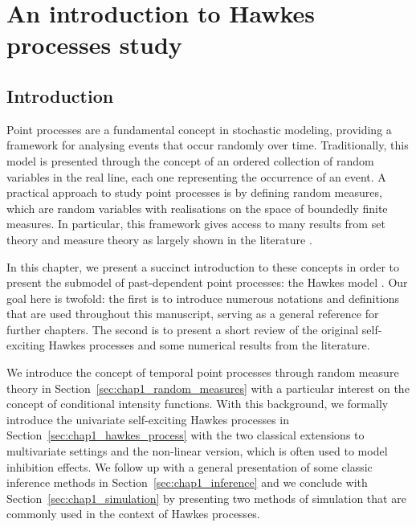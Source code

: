 \leadchapter{
  
}

\chapter[][]{An introduction to Hawkes processes study}\label{chapter:background}

\section{Introduction}

Point processes are a fundamental concept in stochastic modeling, providing a framework for analysing events that occur randomly over time. 
Traditionally, this model is presented through the concept of an ordered collection of random variables in the real line, each one representing the occurrence of an event.
A practical approach to study point processes is by defining random measures, which are random variables with realisations on the space of boundedly finite measures.
In particular, this framework gives access to many results from set theory and measure theory as largely shown in the literature \parencite{Cox1980, Baddeley2006, DaleyV2, Baccelli2020}.

In this chapter, we present a succinct introduction to these concepts in order to present the submodel of past-dependent point processes: the Hawkes model \parencite{Hawkes1971}.
Our goal here is twofold: the first is to introduce numerous notations and definitions that are used throughout this manuscript, serving as a general reference for further chapters. The second is to present a short review of the original self-exciting Hawkes processes and some numerical results from the literature.

We introduce the concept of temporal point processes through random measure theory in Section~\ref{sec:chap1_random_measures} with a particular interest on the concept of conditional intensity functions. 
With this background, we formally introduce the univariate self-exciting Hawkes processes in Section~\ref{sec:chap1_hawkes_process} with the two classical extensions to multivariate settings and the non-linear version, which is often used to model inhibition effects.
We follow up with a general presentation of some classic inference methods in Section~\ref{sec:chap1_inference} and we conclude with Section~\ref{sec:chap1_simulation} by presenting two methods of simulation that are commonly used in the context of Hawkes processes.



